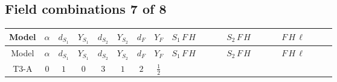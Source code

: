 \documentclass[8pt]{article}
\begin{document}
\begin{landscape}
\subsection*{Field combinations 7 of 8}
\begin{longtable}{@{}cccccccc >{\raggedright\arraybackslash}p{0.21\linewidth} >{\raggedright\arraybackslash}p{0.21\linewidth} >{\raggedright\arraybackslash}p{0.21\linewidth}@{}}
\toprule
Model & $\alpha$ & $d_{S_1}$ & $Y_{S_1}$ & $d_{S_2}$ & $Y_{S_2}$ & $d_F$ & $Y_F$ & $S_1\,F\,H$ & $S_2\,F\,H$ & $F\,H\,\ell$ \\
\midrule
\endfirsthead
\toprule
Model & $\alpha$ & $d_{S_1}$ & $Y_{S_1}$ & $d_{S_2}$ & $Y_{S_2}$ & $d_F$ & $Y_F$ & $S_1\,F\,H$ & $S_2\,F\,H$ & $F\,H\,\ell$ \\
\midrule
\endhead
T3-A & $0$ & $1$ & $0$ & $3$ & $1$ & $2$ & $\frac{1}{2}$ & \scriptsize\adjustbox{max width=\linewidth}{$\begin{gathered} -2 \hbar  \log \left(\frac{\bar{\mu}^{2}}{M_F^2}\right) \overline{y_{1,i_1,r_1}} \overline{Y_{e,i_2,i_3}} H_{a_1} S_1 y_{1,i_2,r_1} Y_{e,i_1,i_3} H_{a_1}{}^{\dagger } S_1{}^{\dagger } \\ -2 \hbar  \log \left(\frac{\bar{\mu}^{2}}{M_F^2}\right) \overline{y_{1,i_1,r_1}} H_{a_2} S_1 y_{1,i_1,r_1} H_{a_1}{}^{\dagger } S_1{}^{\dagger } \mathcal{I}_{H1,a_1,a_2}{}^1 \lambda_{HS_1}^{(1)}^{(1)}\end{gathered}$} & \scriptsize\adjustbox{max width=\linewidth}{$\begin{gathered} -\frac{2 \hbar  \log \left(\frac{\bar{\mu}^{2}}{M_F^2}\right) \overline{y_{2,i_1,r_1}} \overline{Y_{e,i_2,i_3}} H_{a_1} S_{2,j_1} y_{2,i_2,r_1} Y_{e,i_1,i_3} H_{a_1}{}^{\dagger } S_{2,j_1}{}^{\dagger }}{\sqrt{3}} \\ +2 i \sqrt{\frac{2}{3}} \hbar  \log \left(\frac{\bar{\mu}^{2}}{M_F^2}\right) \overline{y_{2,i_1,r_1}} \overline{Y_{e,i_2,i_3}} H_{a_2} S_{2,j_2} y_{2,i_2,r_1} Y_{e,i_1,i_3} H_{a_1}{}^{\dagger } S_{2,j_1}{}^{\dagger } \mathcal{I}_{H2,a_1,a_2,j_2,j_1}{}^1 \\ -\frac{2 \hbar  \log \left(\frac{\bar{\mu}^{2}}{M_F^2}\right) \overline{y_{2,i_1,r_1}} H_{a_2} S_{2,j_2} y_{2,i_1,r_1} H_{a_1}{}^{\dagger } S_{2,j_1}{}^{\dagger } \mathcal{I}_{H2,a_1,a_2,j_2,j_1}{}^2 \lambda_{HS_2}^{(1)}^{(2)}}{\sqrt{3}}\end{gathered}$} & \scriptsize\adjustbox{max width=\linewidth}{$\begin{gathered} +\frac{2 \hbar  \log \left(\frac{\bar{\mu}^{2}}{M_F^2}\right) \overline{y_{1,i_1,r_1}} \overline{y_{2,i_2,r_1}} L_{a_4,i_2}{}^T\, C\, P_L\, L_{a_2,i_1} H_{a_1} H_{a_3} \lambda_5 \epsilon_{a_1,a_2} \epsilon_{a_3,a_4}}{\sqrt{3} M_F} \\ +\frac{2 \hbar  \log \left(\frac{\bar{\mu}^{2}}{M_F^2}\right) \overline{\lambda_5} \overline{L_{a_3,i_1}}\, C\, P_R\, \overline{L_{a_4,i_2}}{}^T y_{1,i_1,r_1} y_{2,i_2,r_1} \epsilon_{a_1,a_3} \epsilon_{a_2,a_4} H_{a_1}{}^{\dagger } H_{a_2}{}^{\dagger }}{\sqrt{3} M_F}\end{gathered}$} \\

\end{longtable}
\end{landscape}
\end{document}
